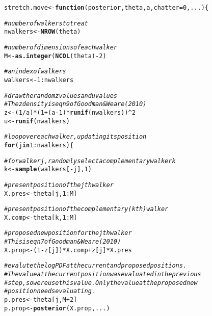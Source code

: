\documentclass{article}\usepackage[]{graphicx}\usepackage[]{color}
\makeatletter
\newcommand{\hlnum}[1]{\textcolor[rgb]{0.686,0.059,0.569}{#1}}%
\newcommand{\hlcom}[1]{\textcolor[rgb]{0.678,0.584,0.686}{\textit{#1}}}%
\newcommand{\hlopt}[1]{\textcolor[rgb]{0,0,0}{#1}}%
\newcommand{\hlstd}[1]{\textcolor[rgb]{0.345,0.345,0.345}{#1}}%
\newcommand{\hlkwa}[1]{\textcolor[rgb]{0.161,0.373,0.58}{\textbf{#1}}}%
\newcommand{\hlkwb}[1]{\textcolor[rgb]{0.69,0.353,0.396}{#1}}%
\newcommand{\hlkwc}[1]{\textcolor[rgb]{0.333,0.667,0.333}{#1}}%
\newcommand{\hlkwd}[1]{\textcolor[rgb]{0.737,0.353,0.396}{\textbf{#1}}}%
\newenvironment{kframe}{%
 \def\at@end@of@kframe{}%
 \ifinner\ifhmode%
  \def\at@end@of@kframe{\end{minipage}}%
  \begin{minipage}{\columnwidth}%
 \fi\fi%
 \def\FrameCommand##1{\hskip\@totalleftmargin \hskip-\fboxsep
 \colorbox{shadecolor}{##1}\hskip-\fboxsep
     \hskip-\linewidth \hskip-\@totalleftmargin \hskip\columnwidth}%
 \MakeFramed {\advance\hsize-\width
   \@totalleftmargin\z@ \linewidth\hsize
   \@setminipage}}%
 {\par\unskip\endMakeFramed%
 \at@end@of@kframe}
\newenvironment{knitrout}{}{} %
\makeatother
\begin{document}
\begin{knitrout}
\color{fgcolor}\begin{kframe}
\begin{alltt}
\hlstd{stretch.move} \hlkwb{<-} \hlkwa{function}\hlstd{(}\hlkwc{posterior}\hlstd{,} \hlkwc{theta}\hlstd{,} \hlkwc{a}\hlstd{,} \hlkwc{chatter}\hlstd{=}\hlnum{0}\hlstd{,} \hlkwc{...}\hlstd{) \{}

  \hlcom{# number of walkers to treat}
  \hlstd{nwalkers} \hlkwb{<-} \hlkwd{NROW}\hlstd{(theta)}

  \hlcom{# number of dimensions of each walker}
  \hlstd{M} \hlkwb{<-} \hlkwd{as.integer}\hlstd{(} \hlkwd{NCOL}\hlstd{(theta)}\hlopt{-}\hlnum{2} \hlstd{)}

  \hlcom{# an index of walkers}
  \hlstd{walkers} \hlkwb{<-} \hlnum{1}\hlopt{:}\hlstd{nwalkers}

  \hlcom{# draw the random z values and u values}
  \hlcom{# The z density is eqn 9 of Goodman & Weare (2010)}
  \hlstd{z} \hlkwb{<-} \hlstd{(}\hlnum{1}\hlopt{/}\hlstd{a)} \hlopt{*} \hlstd{(} \hlnum{1} \hlopt{+} \hlstd{(a}\hlopt{-}\hlnum{1}\hlstd{)}\hlopt{*}\hlkwd{runif}\hlstd{(nwalkers) )}\hlopt{^}\hlnum{2}
  \hlstd{u} \hlkwb{<-} \hlkwd{runif}\hlstd{(nwalkers)}

  \hlcom{# loop over each walker, updating its position}
  \hlkwa{for} \hlstd{(j} \hlkwa{in} \hlnum{1}\hlopt{:}\hlstd{nwalkers) \{}

    \hlcom{# for walker j, randomly select a complementary walker k}
    \hlstd{k} \hlkwb{<-} \hlkwd{sample}\hlstd{(walkers[}\hlopt{-}\hlstd{j],} \hlnum{1}\hlstd{)}

    \hlcom{# present position of the jth walker}
    \hlstd{X.pres} \hlkwb{<-} \hlstd{theta[j,} \hlnum{1}\hlopt{:}\hlstd{M]}

    \hlcom{# present position of the complementary (kth) walker}
    \hlstd{X.comp} \hlkwb{<-} \hlstd{theta[k,} \hlnum{1}\hlopt{:}\hlstd{M]}

    \hlcom{# proposed new position for the jth walker}
    \hlcom{# This is eqn 7 of Goodman & Weare (2010)}
    \hlstd{X.prop} \hlkwb{<-} \hlstd{(}\hlnum{1}\hlopt{-}\hlstd{z[j])}\hlopt{*}\hlstd{X.comp} \hlopt{+} \hlstd{z[j]}\hlopt{*}\hlstd{X.pres}

    \hlcom{# evalute the log PDF at the current and proposed positions.}
    \hlcom{# The value at the current position was evaluated in the previous}
    \hlcom{# step, so we reuse this value. Only the value at the proposed new}
    \hlcom{# position needs evaluating.}
    \hlstd{p.pres} \hlkwb{<-} \hlstd{theta[j, M}\hlopt{+}\hlnum{2}\hlstd{]}
    \hlstd{p.prop} \hlkwb{<-} \hlkwd{posterior}\hlstd{(X.prop, ...)}


\end{alltt}
\end{kframe}
\end{knitrout}
\end{document}
